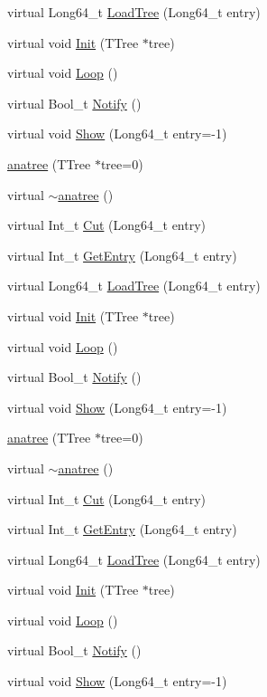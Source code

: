 \begin{DoxyCompactItemize}
virtual Long64\-\_\-t \hyperlink{classanatree_aa7d2bc2d5c95833df9fe2aa61b1f78c9}{Load\-Tree} (Long64\-\_\-t entry)
\item 
virtual void \hyperlink{classanatree_a751a3a2b9b93761020d01def145f96a9}{Init} (T\-Tree $\ast$tree)
\item 
virtual void \hyperlink{classanatree_aeb7abde4f75491d634b4896255608029}{Loop} ()
\item 
virtual Bool\-\_\-t \hyperlink{classanatree_a74d59c62b910973adb4f56454b644dd4}{Notify} ()
\item 
virtual void \hyperlink{classanatree_aa20c82c0f6f2e8a8ff1ee5ae999aebb9}{Show} (Long64\-\_\-t entry=-\/1)
\item 
\hyperlink{classanatree_a681468883d8d6ce67ef59bc627336ae7}{anatree} (T\-Tree $\ast$tree=0)
\item 
virtual \hyperlink{classanatree_abf15dc362f9cb8d08ebcb1811c649a35}{$\sim$anatree} ()
\item 
virtual Int\-\_\-t \hyperlink{classanatree_af469e80902746c85deeab7a0e1b13b59}{Cut} (Long64\-\_\-t entry)
\item 
virtual Int\-\_\-t \hyperlink{classanatree_a3ead58a94b63a5af3188b31514693e39}{Get\-Entry} (Long64\-\_\-t entry)
\item 
virtual Long64\-\_\-t \hyperlink{classanatree_aa7d2bc2d5c95833df9fe2aa61b1f78c9}{Load\-Tree} (Long64\-\_\-t entry)
\item 
virtual void \hyperlink{classanatree_a751a3a2b9b93761020d01def145f96a9}{Init} (T\-Tree $\ast$tree)
\item 
virtual void \hyperlink{classanatree_aeb7abde4f75491d634b4896255608029}{Loop} ()
\item 
virtual Bool\-\_\-t \hyperlink{classanatree_a74d59c62b910973adb4f56454b644dd4}{Notify} ()
\item 
virtual void \hyperlink{classanatree_aa20c82c0f6f2e8a8ff1ee5ae999aebb9}{Show} (Long64\-\_\-t entry=-\/1)
\item 
\hyperlink{classanatree_a681468883d8d6ce67ef59bc627336ae7}{anatree} (T\-Tree $\ast$tree=0)
\item 
virtual \hyperlink{classanatree_abf15dc362f9cb8d08ebcb1811c649a35}{$\sim$anatree} ()
\item 
virtual Int\-\_\-t \hyperlink{classanatree_af469e80902746c85deeab7a0e1b13b59}{Cut} (Long64\-\_\-t entry)
\item 
virtual Int\-\_\-t \hyperlink{classanatree_a3ead58a94b63a5af3188b31514693e39}{Get\-Entry} (Long64\-\_\-t entry)
\item 
virtual Long64\-\_\-t \hyperlink{classanatree_aa7d2bc2d5c95833df9fe2aa61b1f78c9}{Load\-Tree} (Long64\-\_\-t entry)
\item 
virtual void \hyperlink{classanatree_a751a3a2b9b93761020d01def145f96a9}{Init} (T\-Tree $\ast$tree)
\item 
virtual void \hyperlink{classanatree_aeb7abde4f75491d634b4896255608029}{Loop} ()
\item 
virtual Bool\-\_\-t \hyperlink{classanatree_a74d59c62b910973adb4f56454b644dd4}{Notify} ()
\item 
virtual void \hyperlink{classanatree_aa20c82c0f6f2e8a8ff1ee5ae999aebb9}{Show} (Long64\-\_\-t entry=-\/1)
\end{DoxyCompactItemize}
